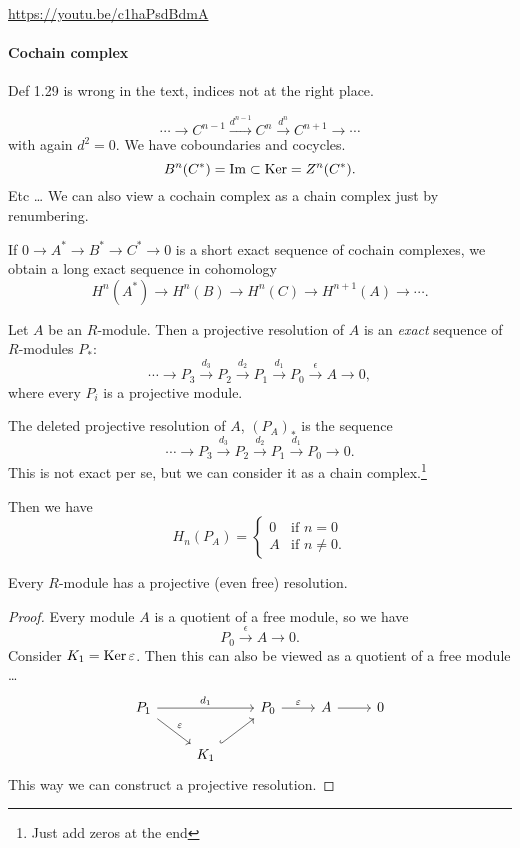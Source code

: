 \url{https://youtu.be/c1haPsdBdmA}
\paragraph{Cochain complex}
\begin{remark}
    Def 1.29 is wrong in the text, indices not at the right place.
\end{remark}
\[
\cdots \to  C^{n-1} \xrightarrow{d^{n-1}}  C^{n} \xrightarrow{d^{n}}   C^{n+1} \to  \cdots
\] 
with again $d^2 = 0$.
We have coboundaries and cocycles.
\[
    B^{n}(C^*) = \operatorname{Im} \subset  \operatorname{Ker} = Z^{n}(C^{*})
.\] 
Etc \ldots
We can also view a cochain complex as a chain complex just by renumbering.

If $0 \to  A^{*} \to  B^{*} \to  C^{*} \to 0$ is a short exact sequence of cochain complexes, we obtain a long exact sequence in cohomology
\[
H^{n}(A^{*}) \to  H^{n}(B) \to  H^{n}(C) \xrightarrow{} H^{n+1} (A) \to   \cdots
.\] 


\begin{definition}
    Let $A$ be an $R$-module. Then a projective resolution of $A$ is an \emph{exact} sequence of $R$-modules $P_*$:
\[
\cdots \to P_3 \xrightarrow{d_3} P_2 \xrightarrow{d_2} P_1 \xrightarrow{d_1} P_0   \xrightarrow{\epsilon} A \to  0
,\] 
where every $P_i$ is a projective module. 

\end{definition}

\begin{definition}
    The deleted projective resolution of $A$, $(P_A)_*$ is the sequence 
    \[
        \cdots \to P_3 \xrightarrow{d_3} P_2 \xrightarrow{d_2} P_1 \xrightarrow{d_1} P_0  \to  0
    .\] 
    This is not exact per se, but we can consider it as a chain complex.\footnote{Just add zeros at the end}
    
    Then we have
    \[
        H_n(P_A) = \begin{cases}
            0 &\text{if $n = 0$}\\
            A & \text{if $n \neq 0$}.
        \end{cases}
    \] 
\end{definition}

\begin{theorem}
    Every $R$-module has a projective (even free) resolution.
\end{theorem}
\begin{proof}
    Every module $A$ is a quotient of a free module, so we have
    \[
        P_0 \xrightarrow{\epsilon} A \to  0
    .\] 
    Consider $K_1 = \operatorname{Ker} \varepsilon$. Then this can also be viewed as a quotient of a free module \ldots
    \[
        \begin{tikzcd}
            P_1 \arrow[rr, "d_1"] \arrow[dr, "\epsilon"]& &P_0 \arrow[r, "\epsilon"] & A \arrow[r, ""] & 0\\
                                                       & K_1 \arrow[ur, "", hook]& &  
        \end{tikzcd}
    \]
    This way we can construct a projective resolution.
\end{proof}


